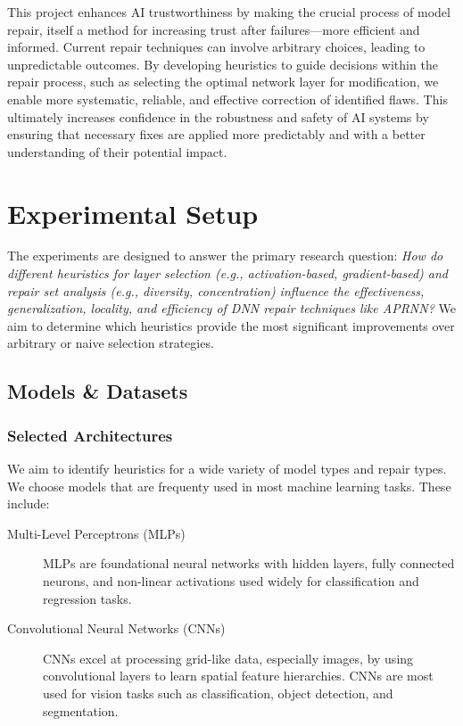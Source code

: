 \documentclass{article}
\begin{document}
This project enhances AI trustworthiness by making the crucial process of model repair, itself a method for increasing trust after failures—more efficient and informed.
Current repair techniques can involve arbitrary choices, leading to unpredictable outcomes.
By developing heuristics to guide decisions within the repair process, such as selecting the optimal network layer for modification, we enable more systematic, reliable, and effective correction of identified flaws.
This ultimately increases confidence in the robustness and safety of AI systems by ensuring that necessary fixes are applied more predictably and with a better understanding of their potential impact.

\section{Experimental Setup}

The experiments are designed to answer the primary research question:
\textit{How do different heuristics for layer selection (e.g., activation-based, gradient-based) and repair set analysis (e.g., diversity, concentration) influence the effectiveness, generalization, locality, and efficiency of DNN repair techniques like APRNN?}
We aim to determine which heuristics provide the most significant improvements over arbitrary or naive selection strategies.

\subsection{Models \& Datasets}

\subsubsection{Selected Architectures}
We aim to identify heuristics for a wide variety of model types and repair types.
We choose models that are frequenty used in most machine learning tasks.
These include:

\begin{description}
	\item[Multi-Level Perceptrons (MLPs)] {
		MLPs are foundational neural networks with hidden layers, fully connected neurons, and non-linear activations used widely for classification and regression tasks.
		}
	\item[Convolutional Neural Networks (CNNs)] {
		CNNs excel at processing grid-like data, especially images, by using convolutional layers to learn spatial feature hierarchies.
		CNNs are most used for vision tasks such as classification, object detection, and segmentation.
		}
\end{description}
\end{document}
